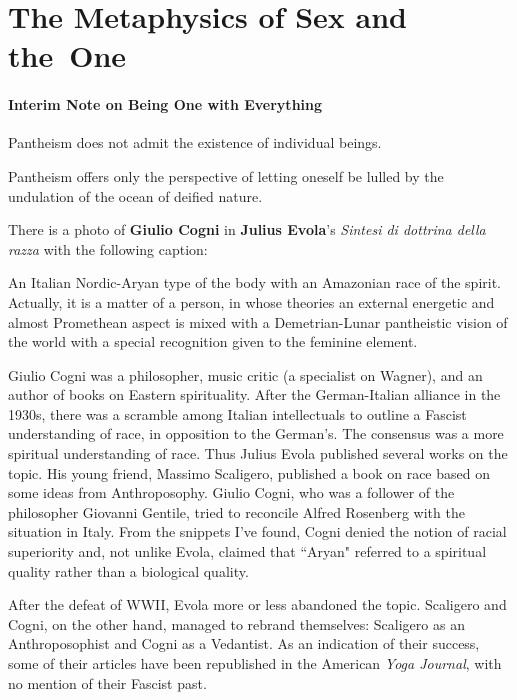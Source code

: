 \section{The Metaphysics of Sex and the One}

\paragraph{Interim Note on Being One with Everything}


\begin{quotex}
Pantheism does not admit the existence of individual beings.

Pantheism offers only the perspective of letting oneself be lulled by the undulation of the ocean of deified nature. 

\end{quotex}

There is a photo of \textbf{Giulio Cogni} in \textbf{Julius Evola}'s \emph{Sintesi di dottrina della razza} with the following caption:

\begin{quotex}
An Italian Nordic-Aryan type of the body with an Amazonian race of the spirit. Actually, it is a matter of a person, in whose theories an external energetic and almost Promethean aspect is mixed with a Demetrian-Lunar pantheistic vision of the world with a special recognition given to the feminine element. 

\end{quotex}
Giulio Cogni was a philosopher, music critic (a specialist on Wagner), and an author of books on Eastern spirituality. After the German-Italian alliance in the 1930s, there was a scramble among Italian intellectuals to outline a Fascist understanding of race, in opposition to the German's. The consensus was a more spiritual understanding of race. Thus Julius Evola published several works on the topic. His young friend, Massimo Scaligero, published a book on race based on some ideas from Anthroposophy. Giulio Cogni, who was a follower of the philosopher Giovanni Gentile, tried to reconcile Alfred Rosenberg with the situation in Italy. From the snippets I've found, Cogni denied the notion of racial superiority and, not unlike Evola, claimed that ``Aryan" referred to a spiritual quality rather than a biological quality.

After the defeat of WWII, Evola more or less abandoned the topic. Scaligero and Cogni, on the other hand, managed to rebrand themselves: Scaligero as an Anthroposophist and Cogni as a Vedantist. As an indication of their success, some of their articles have been republished in the American \emph{Yoga Journal}, with no mention of their Fascist past.

